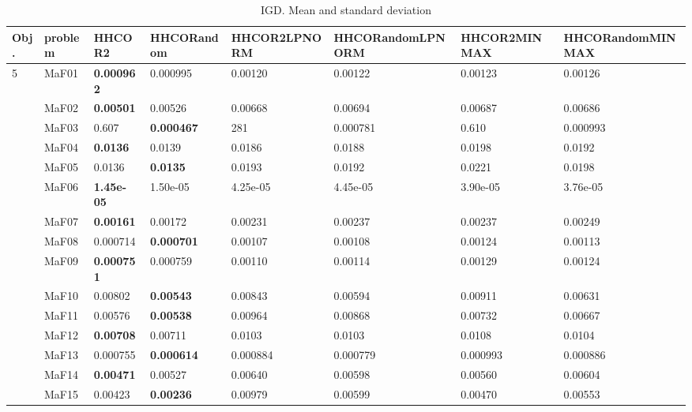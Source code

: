 \documentclass[]{article}
\begin{document}
\begin{landscape}
\begin{table}
\caption{IGD. Mean and standard deviation}
\label{table:mean.IGD}
\centering
\begin{footnotesize}
\begin{tabular}{|l|l|l|l|l|l|l|l|}
\hline
Obj. & problem  & HHCOR2 & HHCORandom & HHCOR2LPNORM & HHCORandomLPNORM & HHCOR2MINMAX & HHCORandomMINMAX \\ \hline

\multirow{15}{*}{5} & MaF01 & \cellcolor{gray95} {\bf 0.000962} & \cellcolor{gray95} 0.000995 & 0.00120 & 0.00122 & 0.00123 & 0.00126\\
 & MaF02 & \cellcolor{gray95} {\bf 0.00501} & \cellcolor{gray95} 0.00526 & 0.00668 & 0.00694 & 0.00687 & 0.00686\\
 & MaF03 & 0.607 & \cellcolor{gray95} {\bf 0.000467} & 281 & \cellcolor{gray95} 0.000781 & 0.610 & 0.000993\\
 & MaF04 & \cellcolor{gray95} {\bf 0.0136} & \cellcolor{gray95} 0.0139 & 0.0186 & 0.0188 & 0.0198 & 0.0192\\
 & MaF05 & \cellcolor{gray95} 0.0136 & \cellcolor{gray95} {\bf 0.0135} & 0.0193 & 0.0192 & 0.0221 & 0.0198\\
 & MaF06 & \cellcolor{gray95} {\bf 1.45e-05} & \cellcolor{gray95} 1.50e-05 & 4.25e-05 & 4.45e-05 & 3.90e-05 & 3.76e-05\\
 & MaF07 & \cellcolor{gray95} {\bf 0.00161} & \cellcolor{gray95} 0.00172 & 0.00231 & 0.00237 & 0.00237 & 0.00249\\
 & MaF08 & \cellcolor{gray95} 0.000714 & \cellcolor{gray95} {\bf 0.000701} & 0.00107 & 0.00108 & 0.00124 & 0.00113\\
 & MaF09 & \cellcolor{gray95} {\bf 0.000751} & \cellcolor{gray95} 0.000759 & 0.00110 & 0.00114 & 0.00129 & 0.00124\\
 & MaF10 & 0.00802 & \cellcolor{gray95} {\bf 0.00543} & 0.00843 & \cellcolor{gray95} 0.00594 & 0.00911 & \cellcolor{gray95} 0.00631\\
 & MaF11 & \cellcolor{gray95} 0.00576 & \cellcolor{gray95} {\bf 0.00538} & 0.00964 & 0.00868 & 0.00732 & 0.00667\\
 & MaF12 & \cellcolor{gray95} {\bf 0.00708} & \cellcolor{gray95} 0.00711 & 0.0103 & 0.0103 & 0.0108 & 0.0104\\
 & MaF13 & \cellcolor{gray95} 0.000755 & \cellcolor{gray95} {\bf 0.000614} & 0.000884 & 0.000779 & 0.000993 & 0.000886\\
 & MaF14 & \cellcolor{gray95} {\bf 0.00471} & \cellcolor{gray95} 0.00527 & 0.00640 & 0.00598 & 0.00560 & 0.00604\\
 & MaF15 & \cellcolor{gray95} 0.00423 & \cellcolor{gray95} {\bf 0.00236} & 0.00979 & 0.00599 & 0.00470 & 0.00553\\
\hline


\end{tabular}
\end{footnotesize}
\end{table}
\end{landscape}
\end{document}
